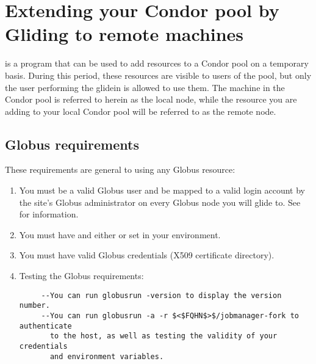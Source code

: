\section{\label{sec:Glidein}Extending your Condor pool by Gliding to remote machines}

 is a program that can be used to add resources to a Condor 
pool on a temporary basis. During this period, these resources are visible 
to users of the pool, but only the user performing the glidein is allowed 
to use them. The machine in the Condor pool is referred to herein as the
local node, while the resource you are adding to your local Condor pool
will be referred to as the remote node.

\subsection{Globus requirements}
These requirements are general to using any Globus resource:
\begin{enumerate}

\item You must be a valid Globus user and be mapped to a valid login account by
the site's Globus administrator on every Globus node you will glide to.
See  for information.

\item You must have  and either  or 
set in your environment.

\item You must have valid Globus credentials (X509 certificate directory).

\item Testing the Globus requirements:
\begin{verbatim}
     --You can run globusrun -version to display the version number.
     --You can run globusrun -a -r $<$FQHN$>$/jobmanager-fork to authenticate 
       to the host, as well as testing the validity of your credentials 
       and environment variables.
\end{verbatim}
\end{enumerate}

